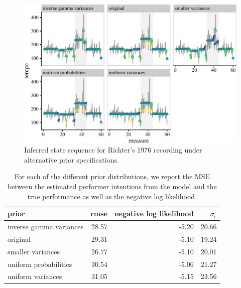\documentclass[aoas]{imsart}
\begin{document}
\begin{figure}

{\centering \includegraphics[width=5in]{gfx/alternative-priors-1} 

}

\caption{Inferred state sequence for Richter's 1976 recording under alternative prior specifications.}\label{fig:alternative-priors}
\end{figure}

\begin{table}

\caption{\label{tab:prior-mses}For each of the different prior distributions, we report the MSE between the estimated performer intentions from the model and the true performance as well as the negative log likelihood.}
\centering
\begin{tabular}[t]{lrrr}
\toprule
prior & rmse & negative log likelihood & $\sigma_{\epsilon}$\\
\midrule
inverse gamma variances & 28.57 & -5.20 & 20.66\\
original & 29.31 & -5.10 & 19.24\\
smaller variances & 26.77 & -5.10 & 20.01\\
uniform probabilities & 30.54 & -5.06 & 21.27\\
uniform variances & 31.05 & -5.15 & 23.56\\
\bottomrule
\end{tabular}
\end{table}
\end{document}
